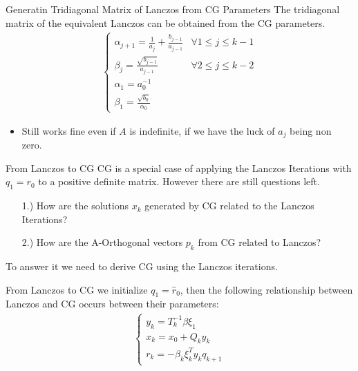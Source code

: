 \documentclass{beamer}
\begin{document}
    \begin{frame}{Generatin Tridiagonal Matrix of Lanczos from CG Parameters}
        The tridiagonal matrix of the equivalent Lanczos can be obtained from the CG parameters. 
        \begin{align}
            \begin{cases}
                \alpha_{j + 1} = \frac{1}{a_j} + \frac{b_{j - 1}}{a_{j - 1}}
                & \forall 1 \le j \le k - 1
                \\
                \beta_{j} = \frac{\sqrt{b_{j - 1}}}{a_{j - 1}}
                & \forall 2 \le j \le k - 2 
                \\
                \alpha_1 = a_0^{-1} & 
                \\
                \beta_1 = \frac{\sqrt{b_0}}{\alpha_0}
            \end{cases}
        \end{align}
        \begin{itemize}
            \item Still works fine even if $A$ is indefinite, if we have the luck of $a_j$ being non zero. 
        \end{itemize}
    \end{frame}
    \begin{frame}{From Lanczos to CG}
         CG is a special case of applying the Lanczos Iterations with $q_1 = r_0$ to a positive definite matrix. However there are still questions left. 
        \begin{enumerate}
            \item [1.)] How are the solutions $x_k$ generated by CG related to the Lanczos Iterations? 
            \item [2.)] How are the A-Orthogonal vectors $p_k$ from CG related to Lanczos?
        \end{enumerate}
        To answer it we need to derive CG using the Lanczos iterations. 
    \end{frame}
    \begin{frame}{From Lanczos to CG}
         we initialize $q_1 = \hat{r}_0$, then the following relationship between Lanczos and CG occurs between their parameters: 
        \begin{align}
            \begin{cases}
                y_k = T^{-1}_k \beta\xi_1
                \\
                x_k = x_0 + Q_k y_k
                \\
                r_k = -\beta_{k}\xi_k^T y_k q_{k +1}
            \end{cases}
        \end{align}
    \end{frame}
\end{document}
